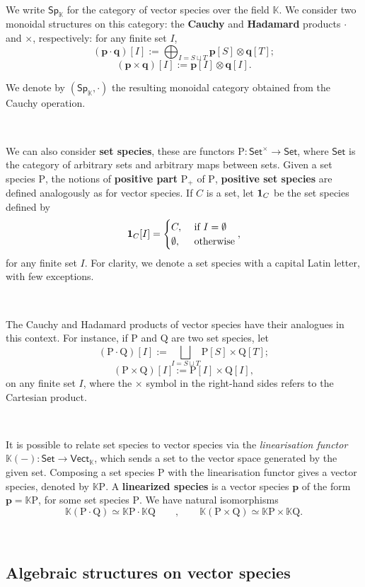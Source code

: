 \documentclass[12pt, reqno]{amsart}
\theoremstyle{definition}
\newcommand{\Fset}{\mathsf{Set^{\times}}}
\newcommand{\Vect}{\mathsf{Vect}}
\newcommand{\Set}{\mathsf{Set}}
\newcommand{\Ss}{\mathsf{Sp}} %
\newcommand{\Ssk}{\mathsf{Sp}_\Kb} %
\newcommand{\Kb}{\mathbb{K}}
\newcommand{\rP}{\mathrm{P}}
\newcommand{\rQ}{\mathrm{Q}}
\newcommand{\tp}{\mathbf{p}}
\newcommand{\tq}{\mathbf{q}}
\begin{document}
\

We write $\Ss_{\mathbb{K}}$ for the category of vector species over the field $\mathbb{K}$.
We consider two monoidal structures on this category: the {\bf Cauchy} and {\bf Hadamard} products $\cdot$ and $\times$, respectively: for any finite set $I$,
\[(\tp \cdot \tq)[I]:=\bigoplus_{I = S \sqcup T}\tp[S]\otimes \tq[T];\]
\[(\tp \times \tq)[I]:=\tp[I] \otimes \tq[I].\]

We denote by $(\Ssk, \cdot)$ the resulting monoidal category obtained from the Cauchy operation.

\

We can also consider {\bf set species}, these are functors $\rP: \Fset \to \Set$, where $\Set$ is the category of arbitrary sets and arbitrary maps between sets. Given a set species $\rP$, the notions of {\bf positive part} $\rP_+$ of $\rP$, {\bf positive set species} are defined analogously as for vector species. If $C$ is a set, let ${\bf 1}_C$ be the set species defined by
\[{\bf 1}_C[I]=\begin{cases}
C,& \text{ if } I= \emptyset\\
\emptyset, & \text{ otherwise}
\end{cases},\]
for any finite set $I$.
For clarity, we denote a set species with a capital Latin letter, with few exceptions.

\

The Cauchy and Hadamard products of vector species have their analogues in this context. For instance, if $\rP$ and $\rQ$ are two set species, let
\[(\rP \cdot \rQ)[I]:=\bigsqcup_{I = S \sqcup T}\rP[S]\times \rQ[T];\]
\[(\rP \times \rQ)[I]:=\rP[I]\times  \rQ[I],\]
on any finite set $I$, where the $\times$ symbol in the right-hand sides refers to the Cartesian product.

\

It is possible to relate set species to vector species via the \emph{linearisation functor} $\mathbb{K}(-): \Set \to \Vect_{\mathbb{K}}$, which sends a set to the vector space generated by the given set. Composing a set species $\rP$ with the linearisation functor gives a vector species, denoted by $\mathbb{K}\rP$. A {\bf linearized species} is a vector species $\tp$ of the form $\tp=\mathbb{K}\rP$, for some set species $\rP$. We have natural isomorphisms
 \[\mathbb{K}(\rP \cdot \rQ)\simeq \mathbb{K}\rP \cdot \mathbb{K}\rQ \qquad , \qquad \mathbb{K}(\rP \times \rQ)\simeq \mathbb{K}\rP \times \mathbb{K}\rQ.\]

\

\subsection{Algebraic structures on vector species}
\end{document}
